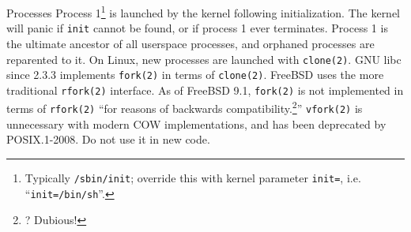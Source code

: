 \documentclass[mathserif,xcolor={dvipsnames,table}]{beamer}
\begin{document}
\begin{frame}{Processes}
Process 1\footnote{\tiny{Typically {\tt /sbin/init}; override this with kernel parameter {\tt init=}, i.e. ``{\tt init=/bin/sh}''.}} is launched by the
kernel following initialization. The kernel will panic if {\tt init} cannot be found,
or if process 1 ever terminates. Process 1 is the ultimate ancestor of all userspace
processes, and orphaned processes are reparented to it.
\vfill
On Linux, new processes are launched with {\tt clone(2)}. GNU libc since 2.3.3
implements {\tt fork(2)} in terms of {\tt clone(2)}. FreeBSD uses the more
traditional {\tt rfork(2)} interface. As of FreeBSD 9.1, {\tt fork(2)} is not
implemented in terms of {\tt rfork(2)} ``for reasons of backwards
compatibility.\footnote{\tiny{? Dubious!}}''
\vfill
{\tt vfork(2)} is unnecessary with modern COW implementations, and has been
deprecated by POSIX.1-2008. Do not use it in new code.
\end{frame}
\end{document}
